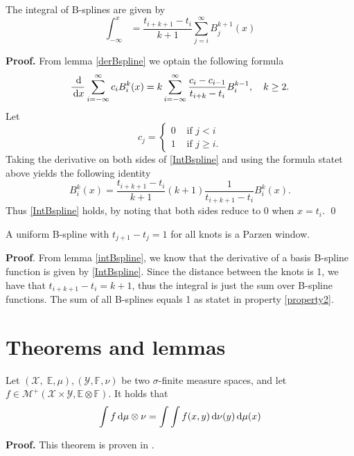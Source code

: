 \begin{lemma}\label{intBspline}
The integral of B-splines are given by
\begin{equation}
\int_{-\infty}^x = \frac{t_{i+k+1}-t_i}{k+1} \sum_{j=i}^\infty B_j^{k+1}(x)
\end{equation}
\end{lemma}
\textbf{Proof.} From lemma \ref{derBspline} we optain the following formula
\begin{equation}
  \frac{\df}{\df x} \sum_{i=-\infty}^\infty c_i B_i^k(x) = k\sum_{i=-\infty}^\infty \frac{c_i-c_{i-1}}{t_{i+k}-t_i}B_i^{k-1}, \quad k\geq 2.\label{IntBspline}
\end{equation}
Let 
\[
  c_j = \begin{cases}0 & \mbox{ if } j<i\\ 1 & \mbox{ if } j\geq i.\end{cases}
\]
Taking the derivative on both sides of \eqref{IntBspline} and using the formula statet above yields the following identity
\begin{equation}
B_i^k(x) = \frac{t_{i+k+1}-t_{i}}{k+1}(k+1)\frac{1}{t_{i+k+1}-t_{i}}B_i^k(x).
\end{equation}
Thus \eqref{IntBspline} holds, by noting that both sides reduce to 0 when $x = t_i$. \hfill\qed\\

\begin{proposition}\label{PWBspline}
A uniform B-spline with $t_{j+1}-t_j = 1$ for all knots is a Parzen window.
\end{proposition}
\textbf{Proof}. From lemma \ref{intBspline}, we know that the derivative of a basis B-spline function is given by \eqref{IntBspline}. Since the distance between the knots is 1, we have that $t_{i+k+1}-t_i = k+1$, thus the integral is just the sum over B-spline functions. The sum of all B-splines equals 1 as statet in property \ref{property2}.\\

\section{Theorems and lemmas}

\begin{theorem}\label{Tonelli}
Let $(\mathcal{X},\;\mathbb{E},\mu),(\mathcal{Y},\mathbb{F},\nu)$ be two $\sigma$-finite measure spaces, and let $f\in\mathcal{M}^+(\mathcal{X}\times \mathcal{Y},\mathbb{E}\otimes\mathbb{F})$. It holds that
\begin{equation}
\int f \,{\rm d}\mu\otimes\nu = \int\int f(x,y) \,{\rm d} \nu(y) \,{\rm d} \mu(x)
\end{equation}
\end{theorem}
\textbf{Proof.} This theorem is proven in \cite[p.~195]{hansen.09}.\\

